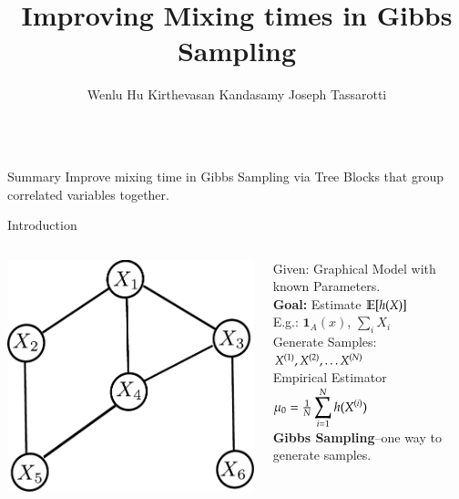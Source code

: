 \documentclass[serif,mathserif,final]{beamer}
\title{Improving Mixing times in Gibbs Sampling}
\author{Wenlu Hu \quad Kirthevasan Kandasamy \quad Joseph Tassarotti}
\institute{10-701 Introduction to Machine Learning, Course Project}
\newcommand{\itemlinespace}{0.22in}
\begin{document}
\begin{frame}{}

  \vspace{\itemlinespace}
  \begin{columns}[t]

    \begin{column}{0.49\linewidth}

      \begin{block}{\Huge Summary}
        {\huge
          Improve mixing time in Gibbs Sampling via Tree Blocks that group
          correlated variables together.
        }
      \end{block}

      \begin{block}{\Huge Introduction}
        {\huge
          \begin{columns}

          \begin{column}{5in}
            \includegraphics[width=4in]{figs/orig_graph}
          \end{column}

          \begin{column}{10in}
             Given: Graphical Model with known Parameters. \\
             \vspace{\itemlinespace}
             \textbf{Goal:} Estimate $\mathbb{E} [h(X)]$ \\
             E.g.: $\mathbf{1}_A(x)$, $\sum_i X_i$ \\
             \vspace{\itemlinespace}
            Generate Samples: $X^{(1)}, X^{(2)}, \dots X^{(N)}$ \\
            \vspace{\itemlinespace}
            Empirical Estimator \\
              $\mu_0 = \frac{1}{N} \displaystyle\sum_{i=1}^N h(X^{(i)})$ \\
            \vspace{\itemlinespace}
            \textbf{Gibbs Sampling}--one way to generate samples.
          \end{column}


\end{columns}}
\end{block}
\end{column}
\end{columns}
\end{frame}
\end{document}
